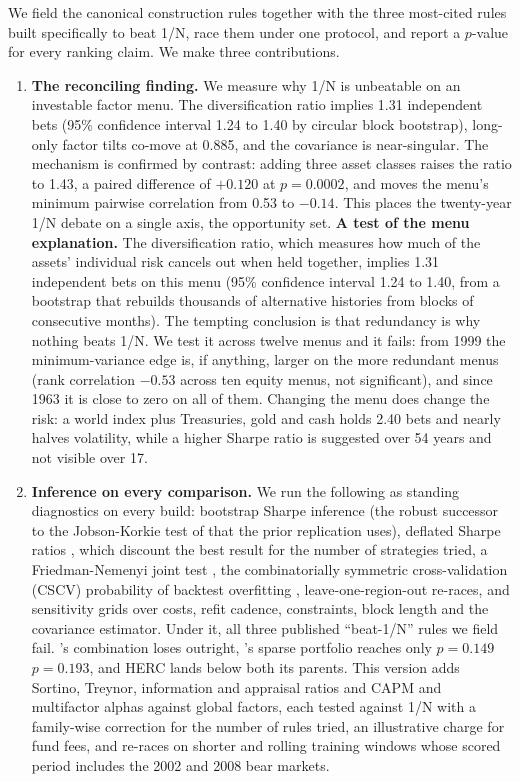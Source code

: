 \documentclass[12pt,letterpaper]{article}
\newcommand{\quita}[1]{{\color{quitarc}#1}}
\newcommand{\nuevo}[1]{{\color{nuevoc}#1}}
\begin{document}
We field the canonical construction rules together with the three most-cited rules built
specifically to beat 1/N, race them under one protocol, and report a $p$-value for every
ranking claim. We make three contributions.

\begin{enumerate}\setlength{\itemsep}{6pt}
\item \quita{\textbf{The reconciling finding.} We measure why
1/N is unbeatable on an investable factor menu. The diversification ratio implies
1.31 independent bets (95\% confidence interval 1.24 to 1.40 by circular block
bootstrap), long-only factor tilts co-move at 0.885, and the covariance is
near-singular. The mechanism is confirmed by contrast: adding three asset classes
raises the ratio to 1.43, a paired difference of $+0.120$ at $p = 0.0002$, and
moves the menu's minimum pairwise correlation from 0.53 to $-0.14$. This places
the twenty-year 1/N debate on a single axis, the opportunity set.}
\nuevo{\textbf{A test of the menu explanation.} The diversification ratio, which measures how much
of the assets' individual risk cancels out when held together, implies 1.31 independent bets on
this menu (95\% confidence interval 1.24 to 1.40, from a bootstrap that rebuilds thousands of
alternative histories from blocks of consecutive months). The tempting conclusion is that
redundancy is why nothing beats 1/N. We test it across twelve menus and it fails: from 1999 the
minimum-variance edge is, if anything, larger on the more redundant menus (rank correlation $-0.53$
across ten equity menus, not significant), and since 1963 it is close to zero on all of them. Changing
the menu does change the risk: a world index plus Treasuries, gold and cash holds 2.40 bets and
nearly halves volatility, while a higher Sharpe ratio is suggested over 54 years and not visible
over 17.}

\item \textbf{Inference on every comparison.} We run the following as
standing diagnostics on every build: \citet{ledoit2008} bootstrap Sharpe
inference (the robust successor to the Jobson-Korkie test of \citeyear{jobson1981} that the prior replication uses), deflated Sharpe ratios \citep{bailey2014}\nuevo{, which discount the best result for
the number of strategies tried}, a Friedman-Nemenyi joint test
\citep{demsar2006}, the combinatorially symmetric cross-validation (CSCV) probability of backtest overfitting \citep{bailey2017}, leave-one-region-out re-races, and sensitivity grids over costs, refit cadence,
constraints, block length and the covariance estimator. Under it, all three
published ``beat-1/N'' rules we field fail. \citeauthor{yuan2023}'s
\citeyearpar{yuan2023} combination loses outright, \citeauthor{brodie2009}'s
\citeyearpar{brodie2009} sparse portfolio reaches only \quita{$p = 0.149$} \nuevo{$p = 0.193$}, and HERC
lands below both its parents.\nuevo{ This version adds Sortino, Treynor, information and
appraisal ratios and CAPM and multifactor alphas against global factors, each tested against
1/N with a family-wise correction for the number of rules tried, an illustrative charge for fund
fees, and re-races on shorter and rolling training windows whose scored period includes the 2002 and
2008 bear markets.}


\end{enumerate}
\end{document}
